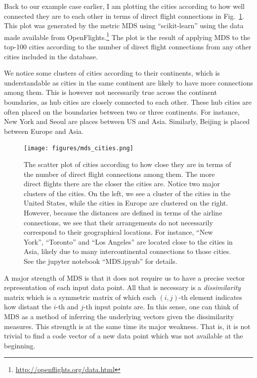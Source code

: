 \documentclass{report}
\begin{document}
Back to our example case earlier, I am plotting the cities according to how well
connected they are to each other in terms of direct flight connections in
Fig.~\ref{fig:mds_cities}. This plot was generated by the metric MDS using
``scikit-learn'' using the data made available from OpenFlights.\footnote{
    \url{http://openflights.org/data.html}
} 
The plot is the result of applying MDS to the top-100 cities according to the
number of direct flight connections from any other cities included in the
database. 

We notice some clusters of cities according to their continents, which is
understandable as cities in the same continent are likely to have more
connections among them. This is however not necessarily true across the
continent boundaries, as hub cities are closely connected to each other. These
hub cities are often placed on the boundaries between two or three continents.
For instance, New York and Seoul are places between US and Asia. Similarly,
Beijing is placed between Europe and Asia. 

\begin{figure}[t]
    \centering
    \texttt{[image: figures/mds\_cities.png]}

    \caption{
        \label{fig:mds_cities}
        The scatter plot of cities according to how close they are in terms
        of the number of direct flight connections among them. The more
        direct flights there are the closer the cities are. Notice two major
        clusters of the cities. On the left, we see a cluster of the cities in
        the United States, while the cities in Europe are clustered on the
        right. However, because the distances are defined in terms of the
        airline connections, we see that their arrangements do not necessarily
        correspond to their geographical locations. For instance, ``New York'',
        ``Toronto'' and ``Los Angeles'' are located close to the cities in Asia,
        likely due to many intercontinental connections to those cities. 
        See the jupyter
        notebook ``MDS.ipynb'' for details.
    }
\end{figure}

A major strength of MDS is that it does not require us to have a precise vector
representation of each input data point. All that is necessary is a {\it
dissimilarity} matrix which is a symmetric matrix of which each $(i,j)$-th
element indicates how distant the $i$-th and $j$-th input points are. In this
sense, one can think of MDS as a method of inferring the underlying vectors
given the dissimilarity measures. This strength is at the same time its major
weakness. That is, it is not trivial to find a code vector of a new data point
which was not available at the beginning.  
\end{document}
